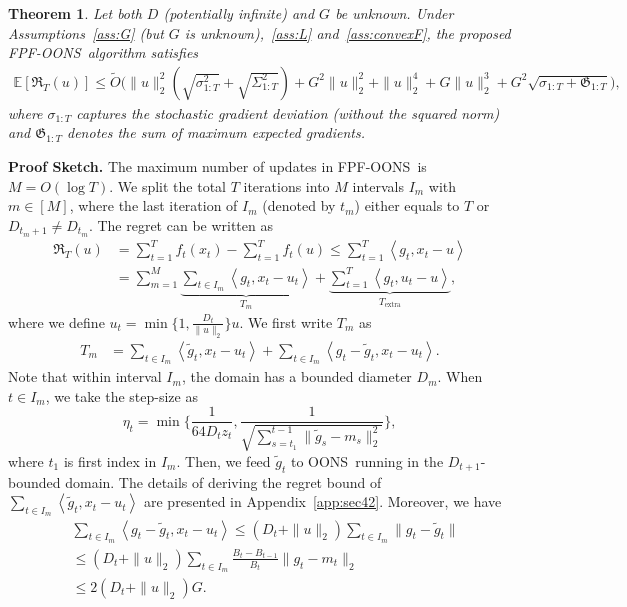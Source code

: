 \documentclass{article}
\theoremstyle{plain}
\newtheorem{theorem}{Theorem}[section]
\theoremstyle{definition}
\theoremstyle{remark}
\newcommand{\oons}{{\sc OONS}}
\newcommand{\fpfons}{{\sc FPF-OONS}}
\newcommand{\regret}{\mathfrak{R}}
\newcommand{\inner}[2]{\left\langle #1, #2 \right\rangle}
\renewcommand{\tilde}{\widetilde}
\begin{document}
\begin{theorem}\label{thm:fullyfree}
Let both $D$ (potentially infinite) and $G$ be unknown. Under Assumptions~\ref{ass:G} (but $G$ is unknown),~\ref{ass:L} and~\ref{ass:convexF}, the proposed \fpfons\ algorithm satisfies  %
\begin{align*}
\mathbb{E}[\regret_{T}(u)]\leq\tilde{O}\Big(\|u\|_2^2(\sqrt{\sigma_{1:T}^2}+\sqrt{\Sigma_{1:T}^2})+G^2\|u\|_2^2+\|u\|_2^4+G\|u\|_2^3+G^2\sqrt{\sigma_{1:T} + \mathfrak{G}_{1:T}}\Big), 
\end{align*}
where $\sigma_{1:T}$ captures the stochastic gradient deviation (without the squared norm) and $\mathfrak{G}_{1:T}$ denotes the sum of maximum expected gradients.
\end{theorem}

\iffalse
\textbf{Proof Sketch.} The maximum number of updates in \fpfons\ is $M=O(\log T)$. We split the total $T$ iterations into $M$ intervals $I_m$ with $m\in[M]$, where the last iteration of $I_m$ (denoted by $t_m$) either equals to $T$ or $D_{t_m+1}\neq D_{t_m}$. The regret can be written as
\begin{align*}
\regret_T(u)&=\sum_{t=1}^T f_t(x_t) - \sum_{t=1}^T f_t(u) \leq \sum_{t=1}^T \inner{g_t}{x_t - u} \\
&= \sum_{m=1}^M \underbrace{\sum_{t \in I_m} \inner{g_t}{x_t - u_t}}_{T_m} + \underbrace{\sum_{t =1}^T \inner{g_t}{u_t - u}}_{T_{\text{extra}}},
\end{align*}
where we define $u_t = \min\{ 1, \frac{D_t}{\| u \|_2} \} u$. We first write $T_m$ as
\begin{align*}
    T_m&= \sum_{t \in I_m} \inner{\tilde{g}_t}{x_t - u_t}+ \sum_{t \in I_m} \inner{g_t - \tilde{g}_t}{x_t - u_t}.
\end{align*}
Note that within interval $I_m$, the domain has a bounded diameter $D_m$. When $t\in I_m$, we take the step-size as
\begin{equation*}
\eta_t = \min\Big\{ \frac{1}{64 D_t z_t}, \frac{1}{\sqrt{\sum_{s=t_1}^{t-1}\| \tilde{g}_s - m_s \|_2^2}} \Big\},
\end{equation*}
where $t_1$ is first index in $I_m$. Then, we feed $\tilde{g}_t$ to \oons\ running in the $D_{t+1}$-bounded domain.%
The details of deriving the regret bound of $\sum_{t \in I_m} \inner{\tilde{g}_t}{x_t - u_t}$ are presented in Appendix~\ref{app:sec42}. Moreover, we have
\begin{align*}
    &\sum_{t \in I_m} \inner{g_t - \tilde{g}_t}{x_t - u_t} \leq (D_t + \| u \|_2 ) \sum_{t \in I_m} \| g_t - \tilde{g}_t \|\\
    &\leq (D_t + \| u \|_2 ) \sum_{t\in I_m} \frac{B_t - B_{t-1}}{B_t} \| g_t - m_t \|_2 \\
    &\leq 2(D_t + \| u \|_2 ) G.
\end{align*}
\end{document}
